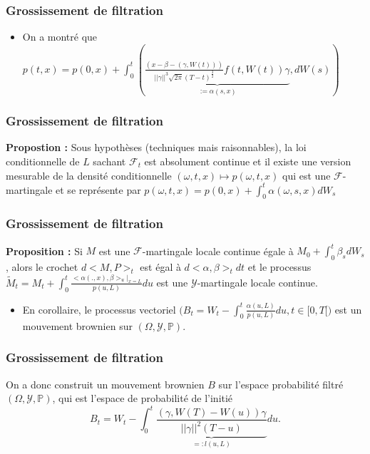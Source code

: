 \documentclass{beamer}
\begin{document}
\begin{frame}
\frametitle{Grossissement de filtration}
\begin{itemize}
\item On a montré que $p \left( t, x \right) = p \left( 0, x \right) + \int_0^t \left( \underbrace{ \frac{\left( x - \beta - \left( \gamma, W \left( t \right) \right) \right)}{||\gamma||^3 \sqrt{2 \pi} \left( T - t \right)^{\frac{3}{2}}} f \left( t, W \left( t \right) \right) \gamma}_{:= \alpha(s, x)}, dW \left( s \right) \right)$
\end{itemize}
\end{frame}


\begin{frame}
\frametitle{Grossissement de filtration}
\textbf{Propostion : } Sous hypothèses (techniques mais raisonnables), la loi conditionnelle de $L$ sachant $\mathcal{F}_t$ est absolument continue et il existe une version mesurable de la densité conditionnelle $(\omega, t, x) \mapsto p(\omega, t, x)$ qui est une $\mathcal{F}$-martingale et se représente par $ p(\omega, t, x) = p(0, x) + \int_{0}^{t}\alpha(\omega, s, x) dW_s$\

\end{frame}


\begin{frame}
\frametitle{Grossissement de filtration}
\textbf{Proposition : } Si $M$ est une $\mathcal{F}$-martingale locale continue égale à $ M_0 + \int_{0}^{t} \beta_s dW_s$, alors le crochet $d<M,P>_t$ est égal à $d<\alpha, \beta>_t dt$ et le processus $\tilde{M}_t = M_t + \int_{0}^{t}\frac{<\alpha(.,x),\beta>_u |_{x=L}}{p(u, L)} du$ est une $\mathcal{Y}$-martingale locale continue.
\begin{itemize}
\item En corollaire, le processus vectoriel $\Big(B_t = W_t - \displaystyle \int_{0}^{t} \frac{\alpha(u, L)}{p(u, L)} du, t \in [0, T[ \Big)$ est un mouvement brownien sur $(\Omega, \mathcal{Y}, \mathbb{P})$. 
\end{itemize}
\end{frame}

\begin{frame}
\frametitle{Grossissement de filtration}

On a donc construit un mouvement brownien $B$ sur l'espace probabilité filtré $(\Omega, \mathcal{Y}, \mathbb{P})$, qui est l'espace de probabilité de l'initié
\begin{equation*}
B_t = W_t - \displaystyle \int_{0}^{t} \underbrace{\frac{\left( \gamma, W \left( T \right) - W \left( u \right) \right) \gamma}{||\gamma||^2 \left( T - u \right)} }_{=:l(u, L)} du.
\end{equation*}

\end{frame}
\end{document}

